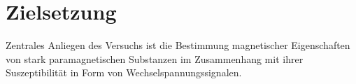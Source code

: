 \section{Zielsetzung}
Zentrales Anliegen des Versuchs ist die Bestimmung magnetischer Eigenschaften von stark paramagnetischen Substanzen im
Zusammenhang mit ihrer Suszeptibilität in Form von Wechselspannungssignalen. 

